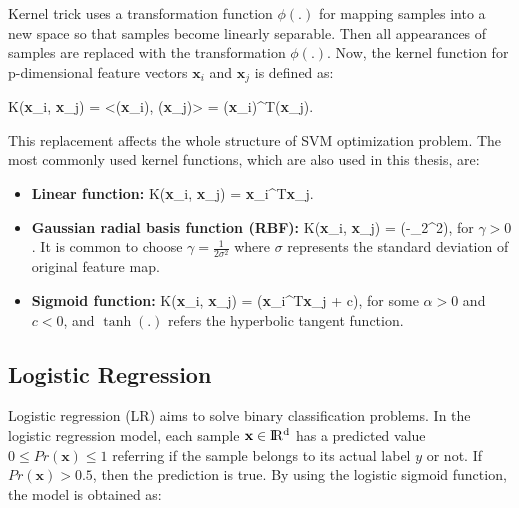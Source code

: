 Kernel trick uses a transformation function $\phi(.)$ for mapping samples into a new space so that samples become linearly separable. Then all appearances of samples are replaced with the transformation $\phi(.)$. Now, the kernel function for p-dimensional feature vectors $\textbf{x}_{i}$ and $\textbf{x}_{j}$ is defined as:

\be
\label{eq:kernel_function}
K(\textbf{x}_{i}, \textbf{x}_{j}) = <\phi(\textbf{x}_{i}), \phi(\textbf{x}_{j})> = \phi(\textbf{x}_{i})^{T}\phi(\textbf{x}_{j}).
\ee

This replacement affects the whole structure of SVM optimization problem. The most commonly used kernel functions, which are also used in this thesis, are:

\begin{itemize}
    \item \textbf{Linear function:}
    \be
    \label{eq:lienar_kernel_function}
    K(\textbf{x}_{i}, \textbf{x}_{j}) = \textbf{x}_{i}^{T}\textbf{x}_{j}.
    \ee
    
    \item \textbf{Gaussian radial basis function (RBF):}
    \be
    \label{eq:rbf_kernel_function}
    K(\textbf{x}_{i}, \textbf{x}_{j}) = \exp(-\gamma {}_{2}^{2})\:,
    \ee
    for $\gamma >0$. It is common to choose $\gamma =\frac{1}{2\sigma^{2}}$ where $\sigma$ represents the standard deviation of original feature map.
    
    \item \textbf{Sigmoid function:}
    \be
    \label{sigmoid_kernel_function}
    K(\textbf{x}_{i}, \textbf{x}_{j}) = \tanh(\alpha \textbf{x}_{i}^{T}\textbf{x}_{j} + c)\:,
    \ee
    for some $\alpha > 0$ and $c < 0$, and $\tanh(.)$ refers the hyperbolic tangent function.

\end{itemize}

\subsection{Logistic Regression}


Logistic regression (LR) aims to solve binary classification problems.
In the logistic regression model, each sample $\textbf{x} \in \rm I\!R^{d}$ has a predicted value $ 0 \leq Pr(\textbf{x}) \leq 1$ referring if the sample belongs to its actual label $y$ or not. If $Pr(\textbf{x})>0.5$, then the prediction is true. By using the logistic sigmoid function, the model is obtained as:

